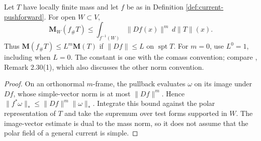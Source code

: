 \begin{proposition}\label{prop:current-pushforward-mass}
Let $T$ have locally finite mass and let $f$ be as in Definition \ref{def:current-pushforward}. For open $W\subset V$,
\[
 \mathbf M_W(f_\#T)\leq\int_{f^{-1}(W)}\|Df(x)\|^m\,d\|T\|(x).
\]
Thus $\mathbf M(f_\#T)\leq L^m\mathbf M(T)$ if $\|Df\|\leq L$ on $\operatorname{spt}T$. For $m=0$, use $L^0=1$, including when $L=0$. The constant is one with the comass convention; compare \cite{Sim18}, Remark 2.30(1), which also discusses the other norm convention.
\end{proposition}
\begin{proof}
On an orthonormal $m$-frame, the pullback evaluates $\omega$ on its image under $Df$, whose simple-vector norm is at most $\|Df\|^m$. Hence $\|f^*\omega\|_*\leq\|Df\|^m\|\omega\|_*$. Integrate this bound against the polar representation of $T$ and take the supremum over test forms supported in $W$. The image-vector estimate is dual to the mass norm, so it does not assume that the polar field of a general current is simple.
\end{proof}

